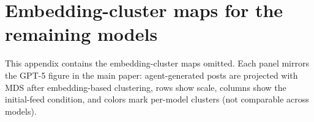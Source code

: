 \documentclass[11pt]{article}
\begin{document}
\section{Embedding-cluster maps for the remaining models}
\label{app:embedding-maps}

This appendix contains the embedding-cluster maps omitted. Each panel mirrors the GPT-5 figure in the main paper: agent-generated posts are projected with MDS after embedding-based clustering, rows show scale, columns show the initial-feed condition, and colors mark per-model clusters (not comparable across models).

  
\end{document}
